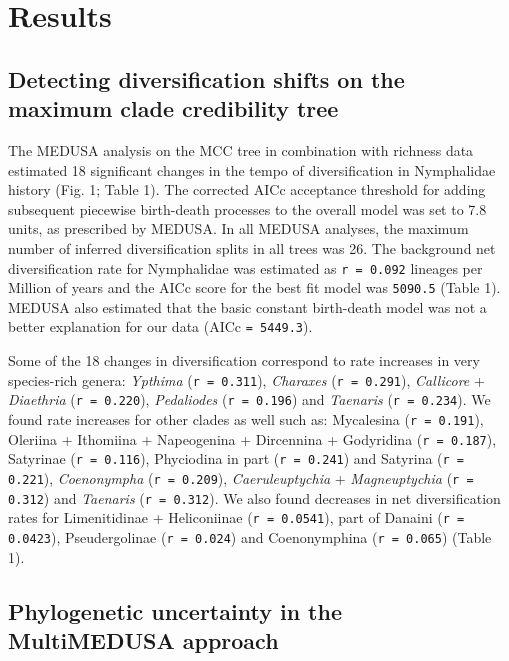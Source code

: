\documentclass[10pt]{article}
\begin{document}
\section*{Results}

\subsection*{Detecting diversification shifts on the maximum clade
credibility tree}

The MEDUSA analysis on the MCC tree in combination with richness data
estimated 18 significant changes in the tempo of diversification in
Nymphalidae history (Fig. 1; Table 1). The corrected AICc acceptance
threshold for adding subsequent piecewise birth-death processes to the
overall model was set to 7.8 units, as prescribed by MEDUSA. In all
MEDUSA analyses, the maximum number of inferred diversification splits
in all trees was 26. The background net diversification rate for
Nymphalidae was estimated as \texttt{r = 0.092} lineages per Million of
years and the AICc score for the best fit model was \texttt{5090.5}
(Table 1). MEDUSA also estimated that the basic constant birth-death
model was not a better explanation for our data (AICc
\texttt{= 5449.3}).

Some of the 18 changes in diversification correspond to rate increases
in very species-rich genera: \emph{Ypthima} (\texttt{r = 0.311}),
\emph{Charaxes} (\texttt{r = 0.291}), \emph{Callicore} +
\emph{Diaethria} (\texttt{r = 0.220}), \emph{Pedaliodes}
(\texttt{r = 0.196}) and \emph{Taenaris} (\texttt{r = 0.234}). We found
rate increases for other clades as well such as: Mycalesina
(\texttt{r = 0.191}), Oleriina + Ithomiina + Napeogenina + Dircennina +
Godyridina (\texttt{r = 0.187}), Satyrinae (\texttt{r = 0.116}),
Phyciodina in part (\texttt{r = 0.241}) and Satyrina
(\texttt{r = 0.221}), \emph{Coenonympha} (\texttt{r = 0.209}),
\emph{Caeruleuptychia} + \emph{Magneuptychia} (\texttt{r = 0.312}) and
\emph{Taenaris} (\texttt{r = 0.312}). We also found decreases in net
diversification rates for Limenitidinae + Heliconiinae
(\texttt{r = 0.0541}), part of Danaini (\texttt{r = 0.0423}),
Pseudergolinae (\texttt{r = 0.024}) and Coenonymphina
(\texttt{r = 0.065}) (Table 1).


\subsection*{Phylogenetic uncertainty in the MultiMEDUSA
approach}
\end{document}
